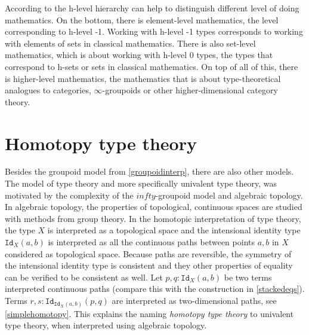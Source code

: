 \documentclass[11pt,a4paper,twoside,xetex,draft]{book}
\newcommand{\keyword}[1]{\emph{#1}\index{#1}}
\newcommand{\op}[1]{\mathtt{#1}}
\begin{document}
According to \cite{Voevodsky2016} the h-level hierarchy can help to distinguish different level of doing mathematics. On the bottom, there is element-level mathematics, the level corresponding to h-level -1. Working with  h-level -1 types corresponds to working with elements of sets in classical mathematics. There is also set-level mathematics, which is about working with h-level 0 types, the types that correspond to h-sets or sets in classical mathematics. On top of all of this, there is higher-level mathematics, the mathematics that is about type-theoretical analogues to categories, $\infty$-groupoids or other higher-dimensional category theory.

\section{Homotopy type theory}\label{homotopicinterp}

Besides the groupoid model from \cref{groupoidinterp}, there are also other models. The model of type theory and more specifically univalent type theory, was motivated by the complexity of the $infty$-groupoid model and algebraic topology. In algebraic topology, the properties of topological, continuous spaces are studied with methods from group theory. In the homotopic interpretation of type theory, the type $X$ is interpreted as a topological space and the intensional identity type $\op{Id}_X(a,b)$ is interpreted as all the continuous paths between points $a,b$ in $X$ considered as topological space. Because paths are reversible, the symmetry of the intensional identity type is consistent and they other properties of equality can be verified to be consistent as well. Let $p,q: \op{Id}_X(a,b)$ be two terms interpreted continuous paths (compare this with the construction in \cref{stackedeqs}). Terms $r,s:\op{Id}_{\op{Id}_X(a,b)}(p,q)$ are interpreted as two-dimensional paths, see \cref{simplehomotopy}. This explains the naming \keyword{homotopy type theory} to univalent type theory, when interpreted using algebraic topology. 
\end{document}
